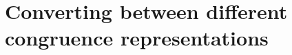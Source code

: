 \chapter{Converting between different congruence representations}
\label{chap:converting}

\lipsum[7]